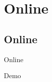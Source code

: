 \section{Online}
\subsection{Online}
\begin{frame}{Online}
	\begin{center}
		\huge{Demo}
	\end{center}
\end{frame}
